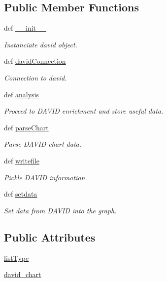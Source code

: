 \subsection*{\-Public \-Member \-Functions}
\begin{DoxyCompactItemize}
\item 
def \hyperlink{classirna_1_1David2tulip_1_1David_1_1David_aeb65c6398af887259b4c55b1e6ee3f99}{\-\_\-\-\_\-init\-\_\-\-\_\-}
\begin{DoxyCompactList}\small\item\em \-Instanciate david object. \end{DoxyCompactList}\item 
def \hyperlink{classirna_1_1David2tulip_1_1David_1_1David_af1aa25bb8d564e2f4e35922f64cab9a6}{david\-Connection}
\begin{DoxyCompactList}\small\item\em \-Connection to david. \end{DoxyCompactList}\item 
def \hyperlink{classirna_1_1David2tulip_1_1David_1_1David_a3d5f6a1a445182a407dc293abcb57fee}{analysis}
\begin{DoxyCompactList}\small\item\em \-Proceed to \-D\-A\-V\-I\-D enrichment and store useful data. \end{DoxyCompactList}\item 
def \hyperlink{classirna_1_1David2tulip_1_1David_1_1David_a7cacbdf2bd104c3772997f464c8aeacf}{parse\-Chart}
\begin{DoxyCompactList}\small\item\em \-Parse \-D\-A\-V\-I\-D chart data. \end{DoxyCompactList}\item 
def \hyperlink{classirna_1_1David2tulip_1_1David_1_1David_a1a6363ef2be2a6e4355b7da7e4902b4b}{writefile}
\begin{DoxyCompactList}\small\item\em \-Pickle \-D\-A\-V\-I\-D information. \end{DoxyCompactList}\item 
def \hyperlink{classirna_1_1David2tulip_1_1David_1_1David_ab4590d525cc6baddbc5ce45f766f7dd6}{setdata}
\begin{DoxyCompactList}\small\item\em \-Set data from \-D\-A\-V\-I\-D into the graph. \end{DoxyCompactList}\end{DoxyCompactItemize}
\subsection*{\-Public \-Attributes}
\begin{DoxyCompactItemize}
\item 
\hyperlink{classirna_1_1David2tulip_1_1David_1_1David_a0af6278779af6f673431f1a10a5be0ab}{list\-Type}
\item 
\hyperlink{classirna_1_1David2tulip_1_1David_1_1David_a28136cb7d08d23a49e80a7d6455aa5cd}{david\-\_\-chart}
\end{DoxyCompactItemize}


